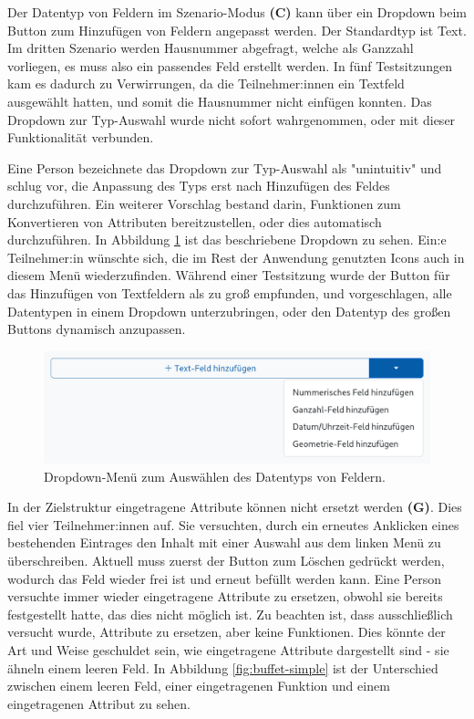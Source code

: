\pskip
Der Datentyp von Feldern im Szenario-Modus \textbf{(C)} kann über ein Dropdown beim Button zum Hinzufügen von Feldern angepasst werden. Der Standardtyp ist Text. Im dritten Szenario werden Hausnummer abgefragt, welche als Ganzzahl vorliegen, es muss also ein passendes Feld erstellt werden. In fünf Testsitzungen kam es dadurch zu Verwirrungen, da die Teilnehmer:innen ein Textfeld ausgewählt hatten, und somit die Hausnummer nicht einfügen konnten. Das Dropdown zur Typ-Auswahl wurde nicht sofort wahrgenommen, oder mit dieser Funktionalität verbunden.

Eine Person bezeichnete das Dropdown zur Typ-Auswahl als "unintuitiv" und schlug vor, die Anpassung des Typs erst nach Hinzufügen des Feldes durchzuführen. Ein weiterer Vorschlag bestand darin, Funktionen zum Konvertieren von Attributen bereitzustellen, oder dies automatisch durchzuführen. In Abbildung \ref{fig:type-dropdown} ist das beschriebene Dropdown zu sehen. Ein:e Teilnehmer:in wünschte sich, die im Rest der Anwendung genutzten Icons auch in diesem Menü wiederzufinden. Während einer Testsitzung wurde der Button für das Hinzufügen von Textfeldern als zu groß empfunden, und vorgeschlagen, alle Datentypen in einem Dropdown unterzubringen, oder den Datentyp des großen Buttons dynamisch anzupassen.

\begin{figure}
  \centering
  \includegraphics[width=.95\textwidth]{assets/datatype-dropdown.png}
  \caption[Dropdown-Menü zum Auswählen des Datentyps von Feldern]{Dropdown-Menü zum Auswählen des Datentyps von Feldern.}
  \label{fig:type-dropdown}
\end{figure}

\pskip
In der Zielstruktur eingetragene Attribute können nicht ersetzt werden \textbf{(G)}. Dies fiel vier Teilnehmer:innen auf. Sie versuchten, durch ein erneutes Anklicken eines bestehenden Eintrages den Inhalt mit einer Auswahl aus dem linken Menü zu überschreiben. Aktuell muss zuerst der Button zum Löschen gedrückt werden, wodurch das Feld wieder frei ist und erneut befüllt werden kann. Eine Person versuchte immer wieder eingetragene Attribute zu ersetzen, obwohl sie bereits festgestellt hatte, das dies nicht möglich ist. Zu beachten ist, dass ausschließlich versucht wurde, Attribute zu ersetzen, aber keine Funktionen. Dies könnte der Art und Weise geschuldet sein, wie eingetragene Attribute dargestellt sind - sie ähneln einem leeren Feld. In Abbildung \ref{fig:buffet-simple} ist der Unterschied zwischen einem leeren Feld, einer eingetragenen Funktion und einem eingetragenen Attribut zu sehen.

